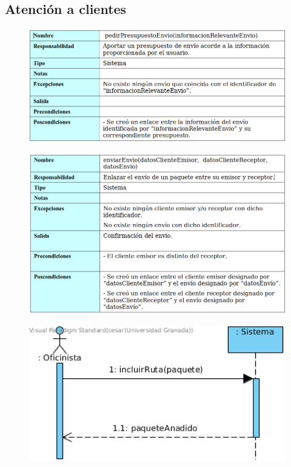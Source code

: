 \subsection{Atención a clientes}
\begin{figure}[H]
	\centering
	\includegraphics[width=16cm]{31}
\end{figure}
\begin{figure}[H]
	\centering
	\includegraphics[width=16cm]{32}
\end{figure}
\begin{figure}[H]
	\centering
	\includegraphics[width=16cm]{33}
\end{figure}
